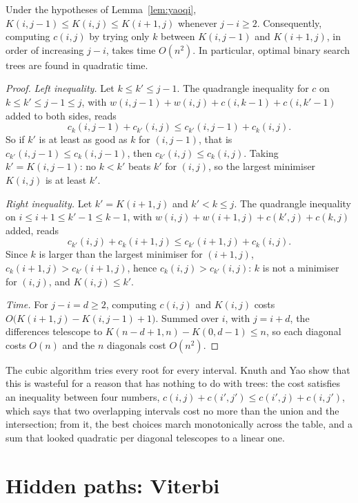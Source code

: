 \begin{theorem}\label{thm:knuthyao}
Under the hypotheses of Lemma~\ref{lem:yaoqi}, $K(i,j-1)\le K(i,j)\le K(i+1,j)$ whenever $j-i\ge2$. Consequently, computing $c(i,j)$ by trying only $k$ between $K(i,j-1)$ and $K(i+1,j)$, in order of increasing $j-i$, takes
time $O(n^2)$. In particular, optimal binary search trees are found in quadratic time.
\end{theorem}
\begin{proof}
\emph{Left inequality.} Let $k\le k'\le j-1$. The quadrangle inequality for $c$ on $k\le k'\le j-1\le j$, with $w(i,j-1)+w(i,j)+c(i,k-1)+c(i,k'-1)$ added to both sides, reads
\[
c_k(i,j-1)+c_{k'}(i,j)\le c_{k'}(i,j-1)+c_k(i,j).
\]
So if $k'$ is at least as good as $k$ for $(i,j-1)$, that is $c_{k'}(i,j-1)\le c_k(i,j-1)$, then $c_{k'}(i,j)\le c_k(i,j)$. Taking $k'=K(i,j-1)$: no $k<k'$ beats $k'$ for $(i,j)$, so the largest minimiser $K(i,j)$ is at least $k'$.

\emph{Right inequality.} Let $k'=K(i+1,j)$ and $k'<k\le j$. The quadrangle inequality on $i\le i+1\le k'-1\le k-1$, with $w(i,j)+w(i+1,j)+c(k',j)+c(k,j)$ added, reads
\[
c_{k'}(i,j)+c_k(i+1,j)\le c_{k'}(i+1,j)+c_k(i,j).
\]
Since $k$ is larger than the largest minimiser for $(i+1,j)$, $c_k(i+1,j)>c_{k'}(i+1,j)$, hence $c_k(i,j)>c_{k'}(i,j)$: $k$ is not a minimiser for $(i,j)$, and $K(i,j)\le k'$.

\emph{Time.} For $j-i=d\ge2$, computing $c(i,j)$ and $K(i,j)$ costs $O\big(K(i+1,j)-K(i,j-1)+1\big)$. Summed over $i$, with $j=i+d$, the differences telescope to $K(n-d+1,n)-K(0,d-1)\le n$, so each diagonal costs $O(n)$
and the $n$ diagonals cost $O(n^2)$.
\end{proof}

\begin{beauty}
The cubic algorithm tries every root for every interval. Knuth and Yao show that this is wasteful for a reason that has nothing to do with trees: the cost satisfies an inequality between four numbers,
$c(i,j)+c(i',j')\le c(i',j)+c(i,j')$, which says that two overlapping intervals cost no more than the union and the intersection; from it, the best choices march monotonically across the table, and a
sum that looked quadratic per diagonal telescopes to a linear one.
\end{beauty}

\section{Hidden paths: Viterbi}\label{sec:viterbi}

